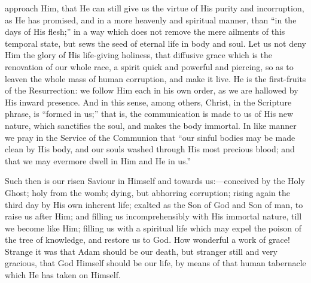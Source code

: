 approach Him, that He can still give us the virtue of His purity and
incorruption, as He has promised, and in a more heavenly and spiritual
manner, than ``in the days of His flesh;'' in a way which does
not remove the mere ailments of this temporal state, but sews the seed
of eternal life in body and soul. Let us not deny Him the glory of His
life-giving holiness, that diffusive grace which is the renovation of
our whole race, a spirit quick and powerful and piercing, so as to
leaven the whole mass of human corruption, and make it live. He is the
first-fruits of the Resurrection: we follow Him each in his own order,
as we are hallowed by His inward presence. And in this sense, among
others, Christ, in the Scripture phrase, is ``formed in us;''
that is, the communication is made to us of His new nature, which
sanctifies the soul, and makes the body immortal. In like manner we pray
in the Service of the Communion that ``our sinful bodies may be made
clean by His body, and our souls washed through His most precious blood;
and that we may evermore dwell in Him and He in us.''

Such then is our risen Saviour in Himself and towards us:—conceived
by the Holy Ghost; holy from the womb; dying, but abhorring corruption;
rising again the third day by His own inherent life; exalted as the Son
of God and Son of man, to raise us after Him; and filling us
incomprehensibly with His immortal nature, till we become like Him;
filling us with a spiritual life which may expel the poison of the tree
of knowledge, and restore us to God. How wonderful a work of grace!
Strange it was that Adam should be our death, but stranger still and
very gracious, that God Himself should be our life, by means of that
human tabernacle which He has taken on Himself.

